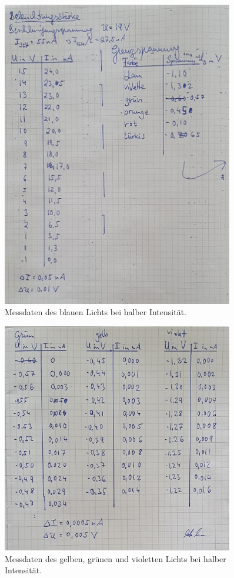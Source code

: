\begin{figure}
    \centering
    \includegraphics[width=0.9\textwidth]{content/Laborbuch_halb.jpg}
    \caption{Messdaten des blauen Lichts bei halber Intensität.}
\end{figure}

\begin{figure}
    \centering
    \includegraphics[width=0.9\textwidth]{content/Laborbuch_bunt.jpg}
    \caption{Messdaten des gelben, grünen und violetten Lichts bei halber Intensität.}
\end{figure}

%
